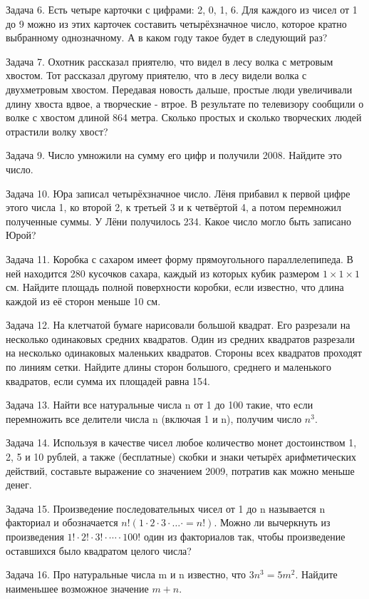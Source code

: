 \documentclass[12pt]{article}
\begin{document}
Задача 6. Есть четыре карточки с цифрами: 2, 0, 1, 6. Для каждого из чисел от 1 до 9 можно из этих карточек составить четырёхзначное число, которое кратно выбранному однозначному. А в каком году такое будет в следующий раз?

Задача 7. Охотник рассказал приятелю, что видел в лесу волка с метровым хвостом. Тот рассказал другому приятелю, что в лесу видели волка с двухметровым хвостом. Передавая новость дальше, простые люди увеличивали длину хвоста вдвое, а творческие - втрое. В результате по телевизору сообщили о волке с хвостом длиной 864 метра. Сколько простых и сколько творческих людей отрастили волку хвост?

Задача 9. Число умножили на сумму его цифр и получили 2008. Найдите это число.

Задача 10. Юра записал четырёхзначное число. Лёня прибавил к первой цифре этого числа 1, ко второй 2, к третьей 3 и к четвёртой 4, а потом перемножил полученные суммы. У Лёни получилось 234. Какое число могло быть записано Юрой?

Задача 11. Коробка с сахаром имеет форму прямоугольного параллелепипеда. В ней находится 280 кусочков сахара, каждый из которых кубик размером $1\times1\times1$ см. Найдите площадь полной поверхности коробки, если известно, что длина каждой из её сторон меньше 10 см.

Задача 12. На клетчатой бумаге нарисовали большой квадрат. Его разрезали на несколько одинаковых средних квадратов. Один из средних квадратов разрезали на несколько одинаковых маленьких квадратов. Стороны всех квадратов проходят по линиям сетки. Найдите длины сторон большого, среднего и маленького квадратов, если сумма их площадей равна 154.

Задача 13. Найти все натуральные числа n от 1 до 100 такие, что если перемножить все делители числа n (включая 1 и n), получим число $n^3$.

Задача 14. Используя в качестве чисел любое количество монет достоинством 1, 2, 5 и 10 рублей, а также (бесплатные) скобки и знаки четырёх арифметических действий, составьте выражение со значением 2009, потратив как можно меньше денег.

Задача 15. Произведение последовательных чисел от 1 до n называется n факториал и обозначается $n!(1\cdot2\cdot3\cdot\dots\cdot=n!)$. Можно ли вычеркнуть из произведения $1!\cdot2!\cdot3!\cdot\dotsb\cdot100!$ один из факториалов так, чтобы произведение оставшихся было квадратом целого числа?

Задача 16. Про натуральные числа m и n известно, что $3n^3= 5m^2$. Найдите наименьшее возможное значение $m+n$.
\end{document}
